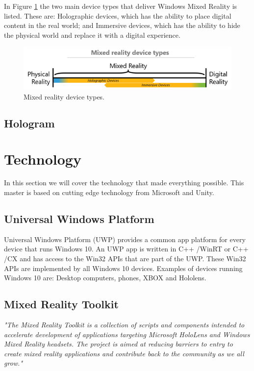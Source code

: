     In Figure \ref{fig:mrdevicetypes} the two main device types that deliver Windows Mixed Reality is listed. These are: Holographic devices, which has the ability to place digital content in the real world;\cite{wdc-mr} and Immersive devices, which has the ability to hide the physical world and replace it with a digital experience.\cite{wdc-mr} 
    \begin{figure}[!ht]
        \centering
        \includegraphics[scale=1]{figures/mixedrealityspectrumdevicetypes.png}
        \caption{Mixed reality device types.\cite{wdc-mr}}
        \label{fig:mrdevicetypes}
    \end{figure}
    
    \subsection{Hologram}

\section{Technology}
In this section we will cover the technology that made everything possible. This master is based on cutting edge technology from Microsoft and Unity.

    \subsection{Universal Windows Platform}
    Universal Windows Platform (UWP) provides a common app platform for every device that runs Windows 10. An UWP app is written in C++ /WinRT or C++ /CX and has access to the Win32 APIs that are part of the UWP. These Win32 APIs are implemented by all Windows 10 devices.\cite{wdc-UWP} Examples of devices running Windows 10 are: Desktop computers, phones, XBOX and Hololens.
    
    \subsection{Mixed Reality Toolkit}
    \emph{"The Mixed Reality Toolkit is a collection of scripts and components intended to accelerate development of applications targeting Microsoft HoloLens and Windows Mixed Reality headsets. The project is aimed at reducing barriers to entry to create mixed reality applications and contribute back to the community as we all grow."}\cite{MRToolkitReadme}

